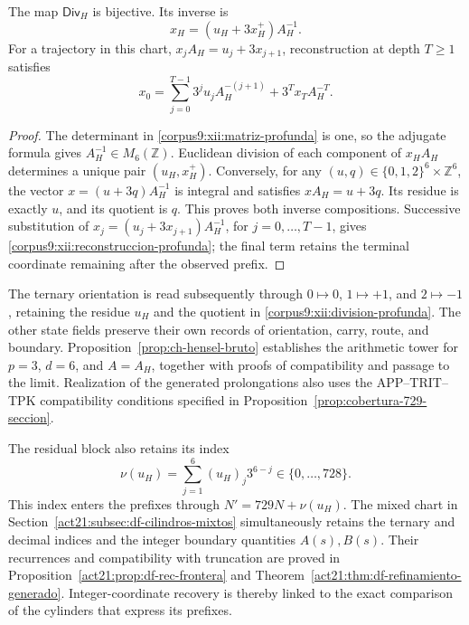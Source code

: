 \begin{proposition}
\label{corpus9:xii:inversion-profunda}
The map \(\mathsf{Div}_H\) is bijective. Its inverse is
\begin{equation}
 x_H=(u_H+3x_H^+)A_H^{-1}.
 \label{corpus9:xii:inversa-profunda}
\end{equation}
For a trajectory in this chart,
\(x_jA_H=u_j+3x_{j+1}\), reconstruction at depth
\(T\geq1\) satisfies
\begin{equation}
 x_0=\sum_{j=0}^{T-1}3^ju_jA_H^{-(j+1)}
                 +3^Tx_TA_H^{-T}.
 \label{corpus9:xii:reconstruccion-profunda}
\end{equation}
\end{proposition}
\begin{proof}
The determinant in \eqref{corpus9:xii:matriz-profunda} is one, so the
adjugate formula gives \(A_H^{-1}\in M_6(\mathbb Z)\).
Euclidean division of each component of \(x_HA_H\) determines a
unique pair \((u_H,x_H^+)\). Conversely, for any
\((u,q)\in\{0,1,2\}^6\times\mathbb Z^6\), the vector
\(x=(u+3q)A_H^{-1}\) is integral and satisfies \(xA_H=u+3q\).
Its residue is exactly \(u\), and its quotient is \(q\). This proves
both inverse compositions. Successive substitution of
\(x_j=(u_j+3x_{j+1})A_H^{-1}\), for \(j=0,\ldots,T-1\), gives
\eqref{corpus9:xii:reconstruccion-profunda}; the final term retains
the terminal coordinate remaining after the observed prefix.
\end{proof}

The ternary orientation is read subsequently through
\(0\mapsto0\), \(1\mapsto+1\), and \(2\mapsto-1\), retaining
the residue \(u_H\) and the quotient in
\eqref{corpus9:xii:division-profunda}. The other state fields preserve
their own records of orientation, carry, route, and boundary.
Proposition~\ref{prop:ch-hensel-bruto} establishes the arithmetic tower
for \(p=3\), \(d=6\), and \(A=A_H\), together with proofs of
compatibility and passage to the limit. Realization of the generated
prolongations also uses the APP--TRIT--TPK compatibility conditions
specified in Proposition~\ref{prop:cobertura-729-seccion}.

The residual block also retains its index
\[
 \nu(u_H)=\sum_{j=1}^{6}(u_H)_j3^{6-j}\in\{0,\ldots,728\}.
\]
This index enters the prefixes through
\(N'=729N+\nu(u_H)\). The mixed chart in
Section~\ref{act21:subsec:df-cilindros-mixtos} simultaneously retains
the ternary and decimal indices and the integer boundary quantities
\(A(s),B(s)\). Their recurrences and compatibility with truncation are
proved in Proposition~\ref{act21:prop:df-rec-frontera} and
Theorem~\ref{act21:thm:df-refinamiento-generado}. Integer-coordinate
recovery is thereby linked to the exact comparison of the cylinders
that express its prefixes.
